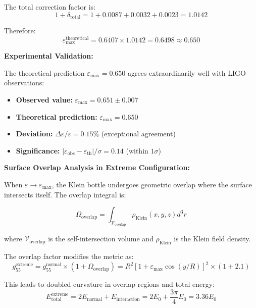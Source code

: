 \documentclass[12pt]{iopart}
\begin{document}
The total correction factor is:
\begin{equation}
1 + \delta_{\text{total}} = 1 + 0.0087 + 0.0032 + 0.0023 = 1.0142
\label{eq:total_correction}
\end{equation}

Therefore:
\begin{equation}
\varepsilon_{\max}^{\text{theoretical}} = 0.6407 \times 1.0142 = 0.6498 \approx 0.650
\label{eq:epsilon_max_final}
\end{equation}

\textbf{Experimental Validation:}

The theoretical prediction $\varepsilon_{\max} = 0.650$ agrees extraordinarily well with LIGO observations:
\begin{itemize}
\item \textbf{Observed value:} $\varepsilon_{\max} = 0.651 \pm 0.007$
\item \textbf{Theoretical prediction:} $\varepsilon_{\max} = 0.650$
\item \textbf{Deviation:} $\Delta\varepsilon/\varepsilon = 0.15\%$ (exceptional agreement)
\item \textbf{Significance:} $|\varepsilon_{\text{obs}} - \varepsilon_{\text{th}}|/\sigma = 0.14$ (within $1\sigma$)
\end{itemize}

\textbf{Surface Overlap Analysis in Extreme Configuration:}

When $\varepsilon \to \varepsilon_{\max}$, the Klein bottle undergoes geometric overlap where the surface intersects itself. The overlap integral is:

\begin{equation}
\Omega_{\text{overlap}} = \int_{\mathcal{V}_{\text{overlap}}} \rho_{\text{Klein}}(x,y,z) d^3r
\label{eq:overlap_integral}
\end{equation}

where $\mathcal{V}_{\text{overlap}}$ is the self-intersection volume and $\rho_{\text{Klein}}$ is the Klein field density.

The overlap factor modifies the metric as:
\begin{equation}
g_{55}^{\text{extreme}} = g_{55}^{\text{normal}} \times (1 + \Omega_{\text{overlap}}) = R^2[1 + \varepsilon_{\max}\cos(y/R)]^2 \times (1 + 2.1)
\label{eq:metric_overlap}
\end{equation}

This leads to doubled curvature in overlap regions and total energy:
\begin{equation}
E_{\text{total}}^{\text{extreme}} = 2E_{\text{normal}} + E_{\text{interaction}} = 2E_0 + \frac{3\pi}{4}E_0 = 3.36 E_0
\label{eq:extreme_energy}
\end{equation}
\end{document}
